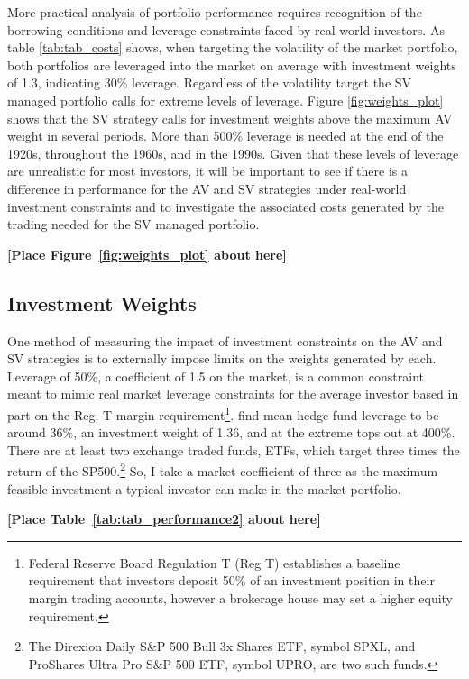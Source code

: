 More practical analysis of portfolio performance requires recognition of the borrowing conditions and leverage constraints faced by real-world investors. As table \ref{tab:tab_costs} shows, when targeting the volatility of the market portfolio, both portfolios are leveraged into the market on average with investment weights of 1.3, indicating 30\% leverage. Regardless of the volatility target the SV managed portfolio calls for extreme levels of leverage. Figure \ref{fig:weights_plot} shows that the SV strategy calls for investment weights above the maximum AV weight in several periods. More than 500\% leverage is needed at the end of the 1920s, throughout the 1960s, and in the 1990s. Given that these levels of leverage are unrealistic for most investors, it will be important to see if there is a difference in performance for the AV and SV strategies under real-world investment constraints and to investigate the associated costs generated by the trading needed for the SV managed portfolio.
\bigskip
\centerline{\bf [Place Figure~\ref{fig:weights_plot} about here]}
\bigskip

\subsection{Investment Weights}
One method of measuring the impact of investment constraints on the AV and SV strategies is to externally impose limits on the weights generated by each. Leverage of 50\%, a coefficient of 1.5 on the market, is a common constraint meant to mimic real market leverage constraints for the average investor based in part on the Reg. T margin requirement\footnote{Federal Reserve Board Regulation T (Reg T) establishes a baseline requirement that investors deposit 50\% of an investment position in their margin trading accounts, however a brokerage house may set a higher equity requirement.}. \citep{Campbell2008,Rapach2010,Rapach2013,Huang2015,Rapach2016,moreira_volatility-managed_2017,deuskar_margin_2017} \citet{ang_hedge_2011} find mean hedge fund leverage to be around 36\%, an investment weight of 1.36, and at the extreme tops out at 400\%. There are at least two exchange traded funds, ETFs, which target three times the return of the SP500.\footnote{The Direxion Daily S\&P 500 Bull 3x Shares ETF, symbol SPXL, and ProShares Ultra Pro S\&P 500 ETF, symbol UPRO, are two such funds.} So, I take a market coefficient of three as the maximum feasible investment a typical investor can make in the market portfolio. %
\bigskip
\centerline{\bf [Place Table~\ref{tab:tab_performance2} about here]}
\bigskip

